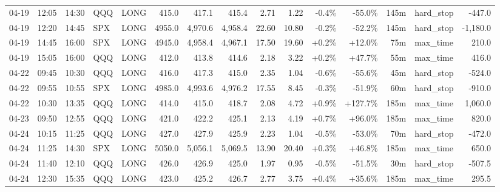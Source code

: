 \documentclass[11pt,a4paper,twoside]{article}
\begin{document}
\begin{landscape}
\begin{center}
\begin{longtable}{>{\color{txtmain}}l l l l l r r r r r r r r >{\color{txtmain}}l r}
04-19 & 12:05 & 14:30 & QQQ & LONG & 415.0 & 417.1 & 415.4 & 2.71 & 1.22 & \textcolor{lossred}{-0.4\%} & \textcolor{lossred}{-55.0\%} & 145m & hard\_stop & \textcolor{lossred}{-447.0} \\
04-19 & 12:20 & 14:45 & SPX & LONG & 4955.0 & 4,970.6 & 4,958.4 & 22.60 & 10.80 & \textcolor{lossred}{-0.2\%} & \textcolor{lossred}{-52.2\%} & 145m & hard\_stop & \textcolor{lossred}{-1,180.0} \\
04-19 & 14:45 & 16:00 & SPX & LONG & 4945.0 & 4,958.4 & 4,967.1 & 17.50 & 19.60 & \textcolor{wingreen}{+0.2\%} & \textcolor{wingreen}{+12.0\%} & 75m & max\_time & \textcolor{wingreen}{210.0} \\
04-19 & 15:05 & 16:00 & QQQ & LONG & 412.0 & 413.8 & 414.6 & 2.18 & 3.22 & \textcolor{wingreen}{+0.2\%} & \textcolor{wingreen}{+47.7\%} & 55m & max\_time & \textcolor{wingreen}{416.0} \\
04-22 & 09:45 & 10:30 & QQQ & LONG & 416.0 & 417.3 & 415.0 & 2.35 & 1.04 & \textcolor{lossred}{-0.6\%} & \textcolor{lossred}{-55.6\%} & 45m & hard\_stop & \textcolor{lossred}{-524.0} \\
04-22 & 09:55 & 10:55 & SPX & LONG & 4985.0 & 4,993.6 & 4,976.2 & 17.55 & 8.45 & \textcolor{lossred}{-0.3\%} & \textcolor{lossred}{-51.9\%} & 60m & hard\_stop & \textcolor{lossred}{-910.0} \\
04-22 & 10:30 & 13:35 & QQQ & LONG & 414.0 & 415.0 & 418.7 & 2.08 & 4.72 & \textcolor{wingreen}{+0.9\%} & \textcolor{wingreen}{+127.7\%} & 185m & max\_time & \textcolor{wingreen}{1,060.0} \\
04-23 & 09:50 & 12:55 & QQQ & LONG & 421.0 & 422.2 & 425.1 & 2.13 & 4.19 & \textcolor{wingreen}{+0.7\%} & \textcolor{wingreen}{+96.0\%} & 185m & max\_time & \textcolor{wingreen}{820.0} \\
04-24 & 10:15 & 11:25 & QQQ & LONG & 427.0 & 427.9 & 425.9 & 2.23 & 1.04 & \textcolor{lossred}{-0.5\%} & \textcolor{lossred}{-53.0\%} & 70m & hard\_stop & \textcolor{lossred}{-472.0} \\
04-24 & 11:25 & 14:30 & SPX & LONG & 5050.0 & 5,056.1 & 5,069.5 & 13.90 & 20.40 & \textcolor{wingreen}{+0.3\%} & \textcolor{wingreen}{+46.8\%} & 185m & max\_time & \textcolor{wingreen}{650.0} \\
04-24 & 11:40 & 12:10 & QQQ & LONG & 426.0 & 426.9 & 425.0 & 1.97 & 0.95 & \textcolor{lossred}{-0.5\%} & \textcolor{lossred}{-51.5\%} & 30m & hard\_stop & \textcolor{lossred}{-507.5} \\
04-24 & 12:30 & 15:35 & QQQ & LONG & 423.0 & 425.2 & 426.7 & 2.77 & 3.75 & \textcolor{wingreen}{+0.4\%} & \textcolor{wingreen}{+35.6\%} & 185m & max\_time & \textcolor{wingreen}{295.5} \\

\end{longtable}
\end{center}
\end{landscape}
\end{document}
